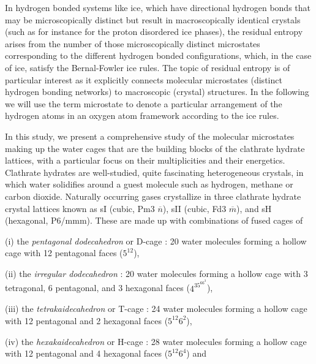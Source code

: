 \documentclass[11pt, proquest]{uwthesis}[2020/02/24]
\let\ce\ch
\begin{document}
\par In hydrogen bonded systems like ice, which have directional hydrogen bonds that may be microscopically distinct but result in macroscopically identical crystals (such as for instance for the proton disordered ice phases), the residual entropy arises from the number of those microscopically distinct microstates corresponding to the different hydrogen bonded configurations, which, in the case of ice, satisfy the Bernal-Fowler ice rules.\autocite{bernal_theory_1933} The topic of residual entropy is of particular interest as it explicitly connects molecular microstates (distinct hydrogen bonding networks) to macroscopic (crystal) structures. In the following we will use the term microstate to denote a particular arrangement of the hydrogen atoms in an oxygen atom framework according to the ice rules.

\par In this study, we present a comprehensive study of the molecular microstates making up the water cages that are the building blocks of the clathrate hydrate lattices, with a particular focus on their multiplicities and their energetics. Clathrate hydrates are well-studied, quite fascinating heterogeneous crystals, in which water solidifies around a guest molecule such as hydrogen, methane or carbon dioxide\autocite{sloan_jr_clathrate_2007,arjmandi_equilibrium_2007,english_structural_2003}. Naturally occurring gases crystallize in three clathrate hydrate crystal lattices known as sI (cubic, Pm3 $\overline{n}$), sII (cubic, Fd3 $\overline{m}$), and sH (hexagonal, P6/mmm). These are made up with combinations of fused cages of\autocite{sloan_jr_clathrate_2007}
	
	\par (i) the \textit{pentagonal dodecahedron} or D-cage \ce{(H2O)_{20}}: 20 water molecules forming a hollow cage with 12 pentagonal faces ($5^{12}$), 
	
	\par (ii) the \textit{irregular dodecahedron} \ce{(H2O)_{20}}: 20 water molecules forming a hollow cage with 3 tetragonal, 6 pentagonal, and 3 hexagonal faces ($4^35^66^3$),
	
	\par (iii) the \textit{tetrakaidecahedron} or T-cage \ce{(H2O)_{24}}: 24 water molecules forming a hollow cage with 12 pentagonal and 2 hexagonal faces ($5^{12}6^2$),
	
	\par (iv) the \textit{hexakaidecahedron} or H-cage \ce{(H2O)_{28}}: 28 water molecules forming a hollow cage with 12 pentagonal and 4 hexagonal faces ($5^{12}6^4$) and
	
\end{document}
